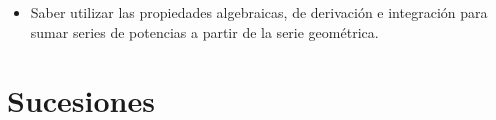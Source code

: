 \begin{itemize}
\item
Saber utilizar las propiedades algebraicas, de derivación e integración para sumar series de potencias a partir de la serie geométrica.

%

\end{itemize}


\newpage

%	
%	
%	
%	
%	


\section{Sucesiones}


